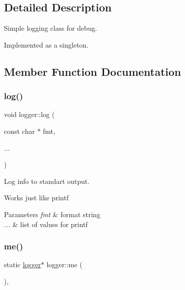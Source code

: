 \subsection{Detailed Description}
Simple logging class for debug. 

Implemented as a singleton. 

\subsection{Member Function Documentation}
\mbox{\label{classlogger_a9a370ab56605a474de25e3fee229cb90}} 
\subsubsection{\texorpdfstring{log()}{log()}}
{\footnotesize\ttfamily void logger\+::log (\begin{DoxyParamCaption}\item[{const char $\ast$}]{fmt,  }\item[{}]{... }\end{DoxyParamCaption})\hspace{0.3cm}{\ttfamily [inline]}}



Log info to standart output. 

Works just like printf


\begin{DoxyParams}{Parameters}
{\em fmt} & format string\\
\hline
{\em ...} & list of values for printf \\
\hline
\end{DoxyParams}
\mbox{\label{classlogger_ad70166a52bca2325ae472aa920a8dbf9}} 
\subsubsection{\texorpdfstring{me()}{me()}}
{\footnotesize\ttfamily static \hyperlink{classlogger}{logger}$\ast$ logger\+::me (\begin{DoxyParamCaption}{ }\end{DoxyParamCaption})\hspace{0.3cm}{\ttfamily [inline]}, {\ttfamily [static]}}



